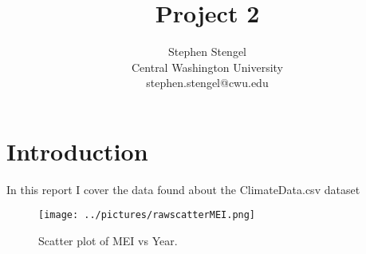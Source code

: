 \documentclass[12pt, letterpaper]{article}
\title{Project 2}
\author{Stephen Stengel\\Central Washington University\\stephen.stengel@cwu.edu}
\begin{document}
\begin{titlepage}
\maketitle


\end{titlepage}


\tableofcontents
\listoffigures
\newpage


\section{Introduction}
In this report I cover the data found about the ClimateData.csv dataset \cite{discovering_stats_r}


\begin{figure}[h]
  \centering
  \texttt{[image: ../pictures/rawscatterMEI.png]}
  \caption{Scatter plot of MEI vs Year.}
  \label{fig:2MEI}
\end{figure}




\clearpage


\end{document}
